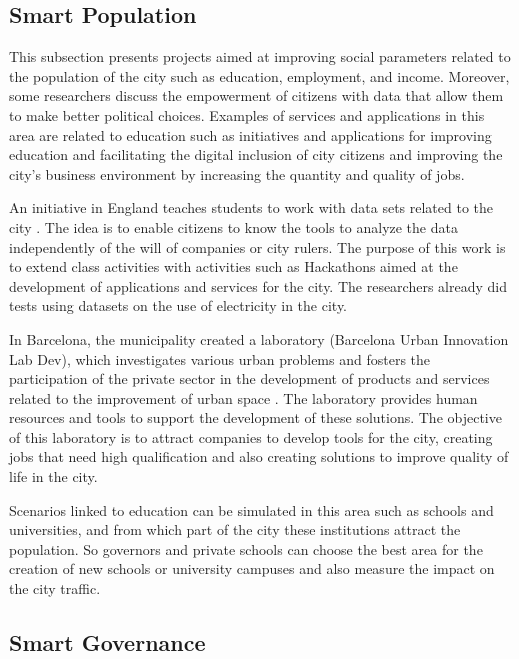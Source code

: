 \subsection{Smart Population}

This subsection presents projects aimed at improving social parameters related to the population of the city such as education, employment, and income. Moreover, some researchers discuss the empowerment of citizens with data that allow them to make better political choices. Examples of services and applications in this area are related to education such as initiatives and applications for improving education and facilitating the digital inclusion of city citizens and improving the city's business environment by increasing the quantity and quality of jobs.

An initiative in England teaches students to work with data sets related to the city \citep {wolff2015education}. The idea is to enable citizens to know the tools to analyze the data independently of the will of companies or city rulers. The purpose of this work is to extend class activities with activities such as Hackathons aimed at the development of applications and services for the city. The researchers already did tests using datasets on the use of electricity in the city.

In Barcelona, the municipality created a laboratory (Barcelona Urban Innovation Lab Dev), which investigates various urban problems and fosters the participation of the private sector in the development of products and services related to the improvement of urban space \citep {bakici2013smart}. The laboratory provides human resources and tools to support the development of these solutions. The objective of this laboratory is to attract companies to develop tools for the city, creating jobs that need high qualification and also creating solutions to improve quality of life in the city.

Scenarios linked to education can be simulated in this area such as schools and universities, and from which part of the city these institutions attract the population. So governors and private schools can choose the best area for the creation of new schools or university campuses and also measure the impact on the city traffic.

\subsection{Smart Governance}
\label{subsec:governanca}

